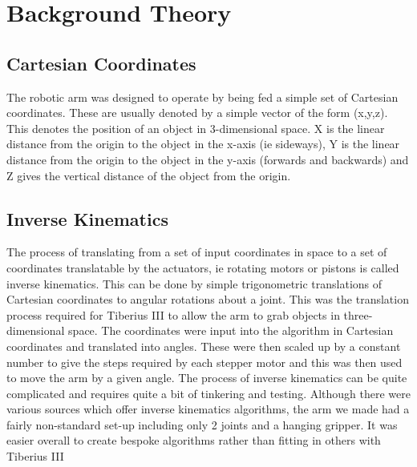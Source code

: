 \section{Background Theory}
\subsection{Cartesian Coordinates}
The robotic arm was designed to operate by being fed a simple set of Cartesian coordinates.  These are usually denoted by a simple vector of the form (x,y,z).  This denotes the position of an object in 3-dimensional space.  X is the linear distance from the origin to the object in the x-axis (ie sideways), Y is the linear distance from the origin to the object in the y-axis (forwards and backwards) and Z gives the vertical distance of the object from the origin.


\subsection{Inverse Kinematics}
The process of translating from a set of input coordinates in space to a set of coordinates translatable by the actuators, ie rotating motors or pistons is called inverse kinematics.  This can be done by simple trigonometric translations of Cartesian coordinates to angular rotations about a joint.  
This was the translation process required for Tiberius III to allow the arm to grab objects in three-dimensional space.  The coordinates were input into the algorithm in Cartesian coordinates and translated into angles.  These were then scaled up by a constant number to give the steps required by each stepper motor and this was then used to move the arm by a given angle.  The process of inverse kinematics can be quite complicated and requires quite a  bit of tinkering and testing.
Although there were various sources which offer inverse kinematics algorithms, the arm we made had a fairly non-standard set-up including only 2 joints and a hanging gripper.  It was easier overall to create bespoke algorithms rather than fitting in others with Tiberius III